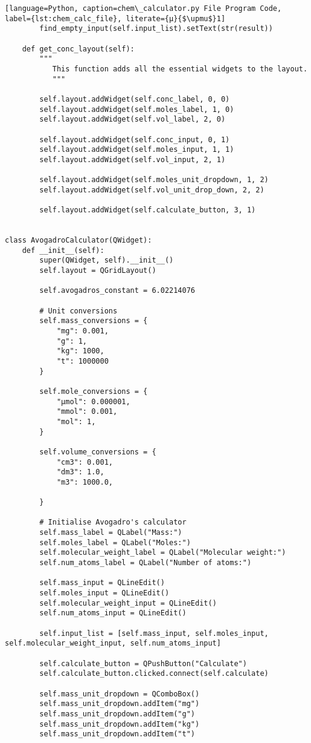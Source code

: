 \begin{lstlisting}[language=Python, caption=chem\_calculator.py File Program Code, label={lst:chem_calc_file}, literate={μ}{$\upmu$}1]
        find_empty_input(self.input_list).setText(str(result))

    def get_conc_layout(self):
        """
           This function adds all the essential widgets to the layout.
           """

        self.layout.addWidget(self.conc_label, 0, 0)
        self.layout.addWidget(self.moles_label, 1, 0)
        self.layout.addWidget(self.vol_label, 2, 0)

        self.layout.addWidget(self.conc_input, 0, 1)
        self.layout.addWidget(self.moles_input, 1, 1)
        self.layout.addWidget(self.vol_input, 2, 1)

        self.layout.addWidget(self.moles_unit_dropdown, 1, 2)
        self.layout.addWidget(self.vol_unit_drop_down, 2, 2)

        self.layout.addWidget(self.calculate_button, 3, 1)


class AvogadroCalculator(QWidget):
    def __init__(self):
        super(QWidget, self).__init__()
        self.layout = QGridLayout()

        self.avogadros_constant = 6.02214076

        # Unit conversions
        self.mass_conversions = {
            "mg": 0.001,
            "g": 1,
            "kg": 1000,
            "t": 1000000
        }

        self.mole_conversions = {
            "μmol": 0.000001,
            "mmol": 0.001,
            "mol": 1,
        }

        self.volume_conversions = {
            "cm3": 0.001,
            "dm3": 1.0,
            "m3": 1000.0,

        }

        # Initialise Avogadro's calculator
        self.mass_label = QLabel("Mass:")
        self.moles_label = QLabel("Moles:")
        self.molecular_weight_label = QLabel("Molecular weight:")
        self.num_atoms_label = QLabel("Number of atoms:")

        self.mass_input = QLineEdit()
        self.moles_input = QLineEdit()
        self.molecular_weight_input = QLineEdit()
        self.num_atoms_input = QLineEdit()

        self.input_list = [self.mass_input, self.moles_input, self.molecular_weight_input, self.num_atoms_input]

        self.calculate_button = QPushButton("Calculate")
        self.calculate_button.clicked.connect(self.calculate)

        self.mass_unit_dropdown = QComboBox()
        self.mass_unit_dropdown.addItem("mg")
        self.mass_unit_dropdown.addItem("g")
        self.mass_unit_dropdown.addItem("kg")
        self.mass_unit_dropdown.addItem("t")


\end{lstlisting}
